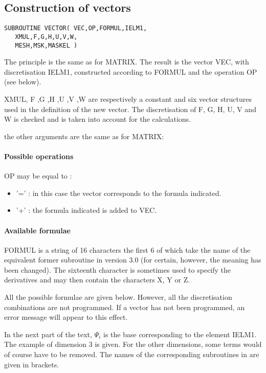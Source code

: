 \subsection{Construction of vectors}

\begin{lstlisting}[language=TelFortran]
SUBROUTINE VECTOR( VEC,OP,FORMUL,IELM1,
   XMUL,F,G,H,U,V,W,
   MESH,MSK,MASKEL )
\end{lstlisting}

The principle is the same as for MATRIX. The result is the vector VEC, with
discretisation IELM1, constructed according to FORMUL and the operation OP (see
below).

XMUL, F ,G ,H ,U ,V ,W are respectively a constant and six vector structures
used in the definition of the new vector. The discretisation of F, G, H, U, V
and W is checked and is taken into account for the calculations.

the other arguments are the same as for MATRIX:

\paragraph{Possible operations}

OP may be equal to :
\begin{itemize}
  \item '=' : in this case the vector corresponds to the formula indicated.
  \item '+' : the formula indicated is added to VEC.
\end{itemize}

\paragraph{Available formulae}

FORMUL is a string of 16 characters the first 6 of which take the name of the
equivalent former subroutine in \bief version 3.0 (for certain, however, the
meaning has been changed). The sixteenth character is sometimes used to specify
the derivatives and may then contain the characters X, Y or Z.

All the possible formulae are given below. However, all the discretisation
combinations are not programmed. If a vector has not been programmed, an error
message will appear to this effect.

In the next part of the text, $\Psi _{i} $ is the base corresponding to the
element IELM1. The example of dimension 3 is given. For the other dimensions,
some terms would of course have to be removed. The names of the corresponding
subroutines in  are given in brackets.

